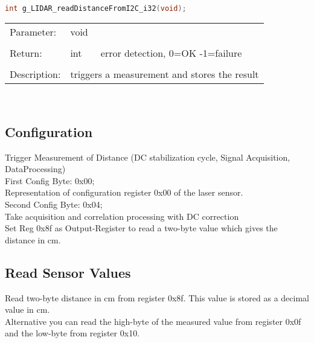 \begin{lstlisting}[language=C, basicstyle=\small, caption=trigger Laser measurement]
int g_LIDAR_readDistanceFromI2C_i32(void);
\end{lstlisting}

\begin{tabular}{lll}
Parameter: & void & \\
					 &	\\
Return: & int & error detection, 0=OK -1=failure\\
							&&\\
Description: & \multicolumn{2}{l}{triggers a measurement and stores the result}\\
\end{tabular}
\\


\subsection{Configuration}

Trigger Measurement of Distance (DC stabilization cycle, Signal Acquisition, DataProcessing)\\

First Config Byte: 0x00;\\
Representation of configuration register 0x00 of the laser sensor.\\
Second Config Byte: 0x04;\\
Take acquisition and correlation processing with DC correction\\

Set Reg 0x8f as Output-Register to read a two-byte value which gives the distance in cm.\\

\subsection{Read Sensor Values}

Read two-byte distance in cm from register 0x8f. This value is stored as a decimal value in cm.\\
Alternative you can read the high-byte of the measured value from register 0x0f and the low-byte from register 0x10.\\


%
%


